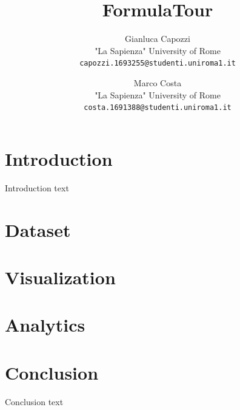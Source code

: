 \documentclass[10pt,twocolumn,letterpaper]{article}
\title{\LARGE FormulaTour}
\author{Gianluca Capozzi\\
	"La Sapienza" University of Rome\\
	{\tt\small capozzi.1693255@studenti.uniroma1.it}
	\and
	Marco Costa\\
	"La Sapienza" University of Rome\\
	{\tt\small costa.1691388@studenti.uniroma1.it}
}
\begin{document}

\begin{abstract}
   \blindtext
\end{abstract}

\section{Introduction}
Introduction text 
\blinddocument

\section{Dataset}


\section{Visualization}


\section{Analytics}


\section{Conclusion}
Conclusion text
\end{document}
